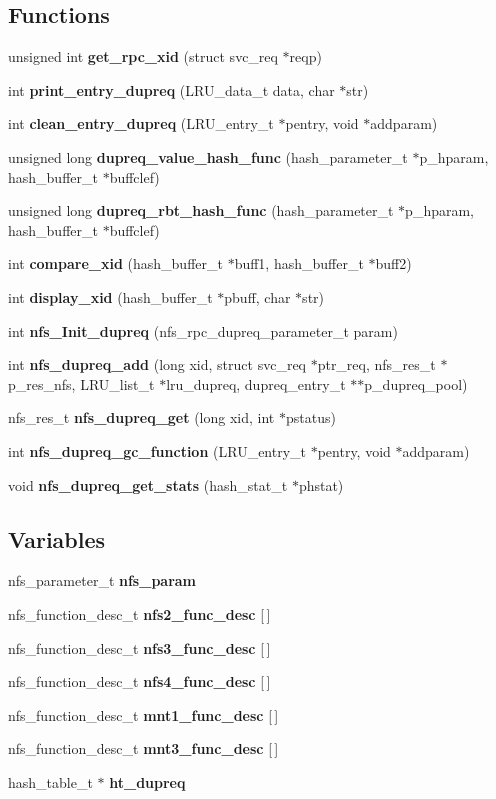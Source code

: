 \subsection*{Functions}
\begin{CompactItemize}
\item 
unsigned int {\bf get\_\-rpc\_\-xid} (struct svc\_\-req $\ast$reqp)
\item 
int {\bf print\_\-entry\_\-dupreq} (LRU\_\-data\_\-t data, char $\ast$str)
\item 
int {\bf clean\_\-entry\_\-dupreq} (LRU\_\-entry\_\-t $\ast$pentry, void $\ast$addparam)
\item 
unsigned long {\bf dupreq\_\-value\_\-hash\_\-func} (hash\_\-parameter\_\-t $\ast$p\_\-hparam, hash\_\-buffer\_\-t $\ast$buffclef)
\item 
unsigned long {\bf dupreq\_\-rbt\_\-hash\_\-func} (hash\_\-parameter\_\-t $\ast$p\_\-hparam, hash\_\-buffer\_\-t $\ast$buffclef)
\item 
int {\bf compare\_\-xid} (hash\_\-buffer\_\-t $\ast$buff1, hash\_\-buffer\_\-t $\ast$buff2)
\item 
int {\bf display\_\-xid} (hash\_\-buffer\_\-t $\ast$pbuff, char $\ast$str)
\item 
int {\bf nfs\_\-Init\_\-dupreq} (nfs\_\-rpc\_\-dupreq\_\-parameter\_\-t param)
\item 
int {\bf nfs\_\-dupreq\_\-add} (long xid, struct svc\_\-req $\ast$ptr\_\-req, nfs\_\-res\_\-t $\ast$p\_\-res\_\-nfs, LRU\_\-list\_\-t $\ast$lru\_\-dupreq, dupreq\_\-entry\_\-t $\ast$$\ast$p\_\-dupreq\_\-pool)
\item 
nfs\_\-res\_\-t {\bf nfs\_\-dupreq\_\-get} (long xid, int $\ast$pstatus)
\item 
int {\bf nfs\_\-dupreq\_\-gc\_\-function} (LRU\_\-entry\_\-t $\ast$pentry, void $\ast$addparam)
\item 
void {\bf nfs\_\-dupreq\_\-get\_\-stats} (hash\_\-stat\_\-t $\ast$phstat)
\end{CompactItemize}
\subsection*{Variables}
\begin{CompactItemize}
\item 
nfs\_\-parameter\_\-t {\bf nfs\_\-param}
\item 
nfs\_\-function\_\-desc\_\-t {\bf nfs2\_\-func\_\-desc} [$\,$]
\item 
nfs\_\-function\_\-desc\_\-t {\bf nfs3\_\-func\_\-desc} [$\,$]
\item 
nfs\_\-function\_\-desc\_\-t {\bf nfs4\_\-func\_\-desc} [$\,$]
\item 
nfs\_\-function\_\-desc\_\-t {\bf mnt1\_\-func\_\-desc} [$\,$]
\item 
nfs\_\-function\_\-desc\_\-t {\bf mnt3\_\-func\_\-desc} [$\,$]
\item 
hash\_\-table\_\-t $\ast$ {\bf ht\_\-dupreq}
\end{CompactItemize}


